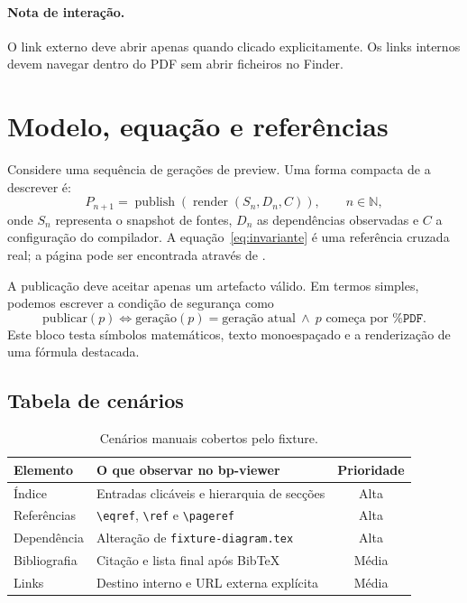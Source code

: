 \documentclass[11pt,a4paper]{article}
\begin{document}
\paragraph{Nota de interação.}
O link externo deve abrir apenas quando clicado explicitamente. Os links
internos devem navegar dentro do PDF sem abrir ficheiros no Finder.

\newpage
\section{Modelo, equação e referências}
\label{sec:matematica}

Considere uma sequência de gerações de preview. Uma forma compacta de a
descrever é:
\begin{equation}
  P_{n+1} = \operatorname{publish}\!\left(\operatorname{render}(S_n,D_n,C)\right),
  \qquad n \in \mathbb{N},
  \label{eq:invariante}
\end{equation}
onde $S_n$ representa o snapshot de fontes, $D_n$ as dependências observadas e
$C$ a configuração do compilador. A equação~\eqref{eq:invariante} é uma
referência cruzada real; a página pode ser encontrada através de
\pageref{eq:invariante}.

A publicação deve aceitar apenas um artefacto válido. Em termos simples,
podemos escrever a condição de segurança como
\[
  \text{publicar}(p) \Longleftrightarrow
  \text{geração}(p)=\text{geração atual}\ \land\ p\text{ começa por }\texttt{\%PDF}.
\]
Este bloco testa símbolos matemáticos, texto monoespaçado e a renderização de
uma fórmula destacada.

\subsection{Tabela de cenários}
\label{subsec:tabela}

\begin{table}[ht]
  \centering
  \caption{Cenários manuais cobertos pelo fixture.}
  \label{tab:cenarios}
  \begin{tabular}{@{}>{\raggedright\arraybackslash}p{3.4cm}p{7.6cm}c@{}}
    \toprule
    Elemento & O que observar no bp-viewer & Prioridade \\
    \midrule
    Índice & Entradas clicáveis e hierarquia de secções & Alta \\
    Referências & \verb|\eqref|, \verb|\ref| e \verb|\pageref| & Alta \\
    Dependência & Alteração de \texttt{fixture-diagram.tex} & Alta \\
    Bibliografia & Citação e lista final após BibTeX & Média \\
    Links & Destino interno e URL externa explícita & Média \\
    \bottomrule
  \end{tabular}
\end{table}
\end{document}
